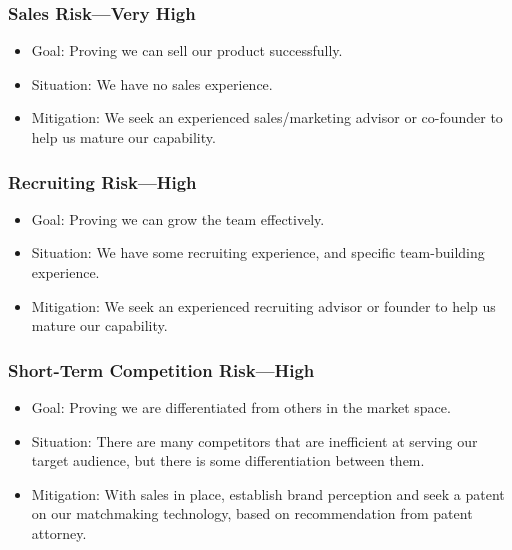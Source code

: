 \documentclass[10pt,openany]{book}
\providecommand{\tightlist}{%
  \setlength{\itemsep}{0pt}\setlength{\parskip}{0pt}}
\begin{document}
\hypertarget{sales-riskvery-high}{%
\subsubsection{Sales Risk---Very High}\label{sales-riskvery-high}}

\begin{itemize}
\tightlist
\item
  Goal: Proving we can sell our product successfully.
\item
  Situation: We have no sales experience.
\item
  Mitigation: We seek an experienced sales/marketing advisor or
  co-founder to help us mature our capability.
\end{itemize}

\hypertarget{recruiting-riskhigh}{%
\subsubsection{Recruiting Risk---High}\label{recruiting-riskhigh}}

\begin{itemize}
\tightlist
\item
  Goal: Proving we can grow the team effectively.
\item
  Situation: We have some recruiting experience, and specific
  team-building experience.
\item
  Mitigation: We seek an experienced recruiting advisor or founder to
  help us mature our capability.
\end{itemize}

\hypertarget{short-term-competition-riskhigh}{%
\subsubsection{Short-Term Competition
Risk---High}\label{short-term-competition-riskhigh}}

\begin{itemize}
\tightlist
\item
  Goal: Proving we are differentiated from others in the market space.
\item
  Situation: There are many competitors that are inefficient at serving
  our target audience, but there is some differentiation between them.
\item
  Mitigation: With sales in place, establish brand perception and seek a
  patent on our matchmaking technology, based on recommendation from
  patent attorney.
\end{itemize}
\end{document}
